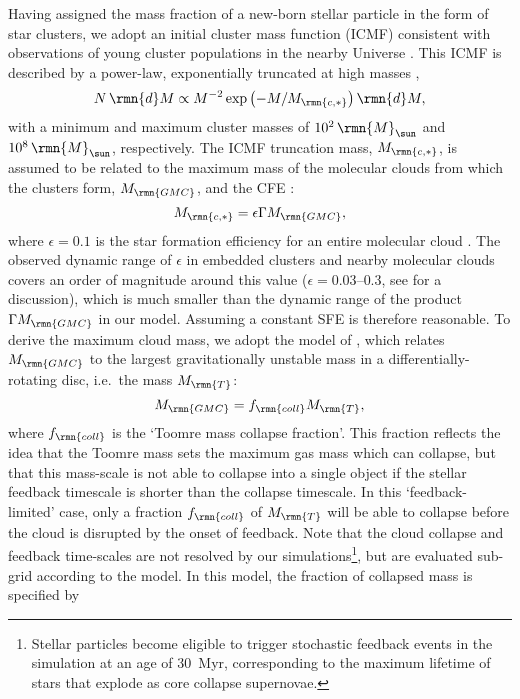 \documentclass[fleqn,usenatbib]{mnras}
\newcommand\Msun{\,\rmn{M}_{\sun}}
\newcommand{\Mgmc}{M_\rmn{GMC}}
\begin{document}
Having assigned the mass fraction of a new-born stellar particle in the form of star clusters, we adopt an initial cluster mass function (ICMF) consistent with observations of young cluster populations in the nearby Universe \citep{Portegies-Zwart_McMillan_and_Gieles_10}. This ICMF is described by a power-law, exponentially truncated at high masses \citep{Schechter_76},
\begin{equation} \label{eq:ICMF}
N \, \rmn{d}M \propto M^{-2} \exp \left(-M/M_\rmn{c,*}\right) \rmn{d}M  ,
\end{equation}
with a minimum and maximum cluster masses of $10^2 \Msun$ and $10^8 \Msun$, respectively. The ICMF truncation mass, $M_\rmn{c,*}$, is assumed to be related to the maximum mass of the molecular clouds from which the clusters form, $\Mgmc$, and the CFE \citep{Kruijssen_14}:
\begin{equation} \label{eq:Mcstar}
M_\rmn{c,*} = \epsilon \Gamma \Mgmc ,
\end{equation}  
where $\epsilon = 0.1$ is the star formation efficiency for an entire molecular cloud \citep*[e.g.][]{Duerr_Imhoff_and_Lada_82, Murray_11}. The observed dynamic range of $\epsilon$ in embedded clusters and nearby molecular clouds covers an order of magnitude around this value ($\epsilon=0.03$--$0.3$, see \citealt{Reina-Campos_and_Kruijssen_17} for a discussion), which is much smaller than the dynamic range of the product $\Gamma \Mgmc$ in our model. Assuming a constant SFE is therefore reasonable. To derive the maximum cloud mass, we adopt the model of \citet{Reina-Campos_and_Kruijssen_17}, which relates $\Mgmc$ to the largest gravitationally unstable mass in a differentially-rotating disc, i.e.~the \citet{Toomre_64} mass $M_\rmn{T}$:
\begin{equation} \label{eq:Mgmc}
\Mgmc = f_\rmn{coll} M_\rmn{T} ,
\end{equation}  
where $f_\rmn{coll}$ is the `Toomre mass collapse fraction'. This fraction reflects the idea that the Toomre mass sets the maximum gas mass which can collapse, but that this mass-scale is not able to collapse into a single object if the stellar feedback timescale is shorter than the collapse timescale. In this `feedback-limited' case, only a fraction $f_\rmn{coll}$ of $M_\rmn{T}$ will be able to collapse before the cloud is disrupted by the onset of feedback. Note that the cloud collapse and feedback time-scales are not resolved by our simulations\footnote{Stellar particles become eligible to trigger stochastic feedback events in the simulation at an age of 30~Myr, corresponding to the maximum lifetime of stars that explode as core collapse supernovae.}, but are evaluated sub-grid according to the \citet{Reina-Campos_and_Kruijssen_17} model. In this model, the fraction of collapsed mass is specified by
\end{document}
